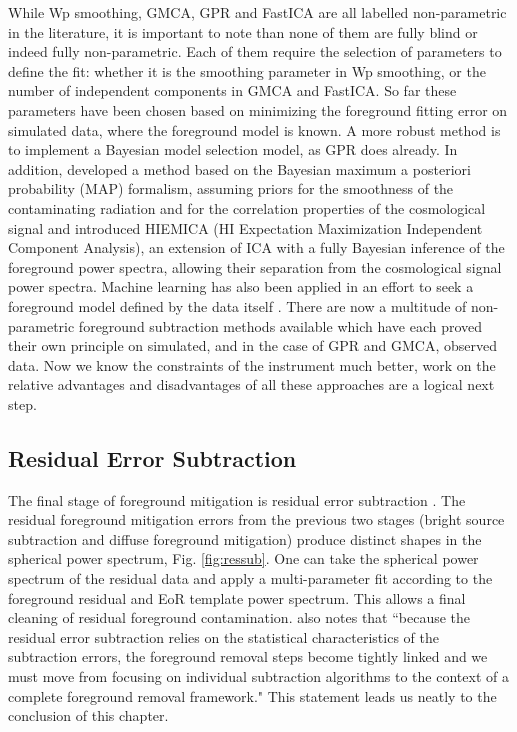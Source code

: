 While Wp smoothing, GMCA, GPR and FastICA are all labelled non-parametric in the literature, it is important to note than none of them are fully blind or indeed fully non-parametric. Each of them require the selection of parameters to define the fit: whether it is the smoothing parameter in Wp smoothing, or the number of independent components in GMCA and FastICA. So far these parameters have been chosen based on minimizing the foreground fitting error on simulated data, where the foreground model is known. A more robust method is to implement a Bayesian model selection model, as GPR does already. In addition, \citet{Gleser2008MNRAS.391..383G} developed a method based on the Bayesian maximum a posteriori probability (MAP) formalism, assuming priors for the smoothness of the contaminating radiation and for the correlation properties of the cosmological signal and \citet{Zhang2016ApJS..222....3Z} introduced HIEMICA (HI Expectation Maximization Independent Component Analysis), an extension of ICA with a fully Bayesian inference of the foreground power spectra, allowing their separation from the cosmological signal power spectra. Machine learning has also been applied in an effort to seek a foreground model defined by the data itself \citet{Li2019MNRAS.485.2628L}. There are now a multitude of non-parametric foreground subtraction methods available which have each proved their own principle on simulated, and in the case of GPR and GMCA, observed data. Now we know the constraints of the instrument much better, work on the relative advantages and disadvantages of all these approaches are a logical next step.

\subsection{Residual Error Subtraction}
The final stage of foreground mitigation is residual error subtraction \citep{Morales2006ApJ...648..767M,Morales2004ApJ...615....7M}. The residual foreground mitigation errors from the previous two stages (bright source subtraction and diffuse foreground mitigation) produce distinct shapes in the spherical power spectrum, Fig. \ref{fig:ressub}. One can take the spherical power spectrum of the residual data and apply a multi-parameter fit according to the foreground residual and EoR template power spectrum. This allows a final cleaning of residual foreground contamination. \citet{Morales2006ApJ...648..767M} also notes that ``because the residual error subtraction relies on the statistical characteristics of the subtraction errors, the foreground removal steps become tightly linked and we must move from focusing on individual subtraction algorithms to the context of a complete foreground removal framework." This statement leads us neatly to the conclusion of this chapter.


